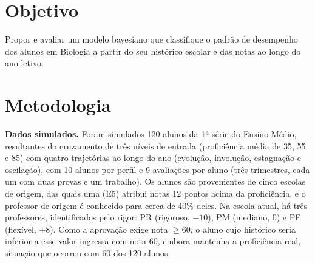 \documentclass[12pt,a4paper]{article}
\begin{document}
\section{Objetivo}

Propor e avaliar um modelo bayesiano que classifique o padrão de desempenho dos alunos em
Biologia a partir do seu histórico escolar e das notas ao longo do ano letivo.

\section{Metodologia}

\textbf{Dados simulados.} Foram simulados 120 alunos da 1ª série do Ensino Médio, resultantes
do cruzamento de três níveis de entrada (proficiência média de 35, 55 e 85) com quatro
trajetórias ao longo do ano (evolução, involução, estagnação e oscilação), com 10 alunos por
perfil e 9 avaliações por aluno (três trimestres, cada um com duas provas e um trabalho). Os
alunos são provenientes de cinco escolas de origem, das quais uma (E5) atribui notas 12 pontos
acima da proficiência, e o professor de origem é conhecido para cerca de 40\% deles. Na escola
atual, há três professores, identificados pelo rigor: PR (rigoroso, $-10$), PM (mediano, 0) e
PF (flexível, $+8$). Como a aprovação exige nota $\ge 60$, o aluno cujo histórico seria inferior
a esse valor ingressa com nota 60, embora mantenha a proficiência real, situação que ocorreu
com 60 dos 120 alunos.
\end{document}
